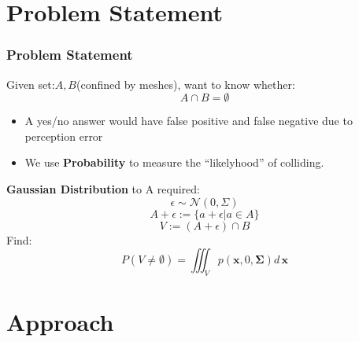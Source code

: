\documentclass{beamer}
\begin{document}

\section{Problem Statement} %


\begin{frame}
	\frametitle{Problem Statement}
	Given set:$A, B$(confined by meshes),
	want to know whether: 
	$$A \cap B = \emptyset$$
	\begin{itemize}
		\item A yes/no answer would have false positive and false negative due to perception error
		\item We use \textbf{Probability} to measure the ``likelyhood'' of colliding.
	\end{itemize}
	\textbf{Gaussian Distribution} to A required:
	$$\epsilon \sim \mathcal{N}(0, \Sigma)$$
	$$A + \epsilon := \{a+\epsilon | a \in A\}$$
	$$V := (A+\epsilon) \cap B$$
	Find: 
	$$P(V \neq \emptyset) = \iiint_Vp(\mathbf{x},0,\mathbf{\Sigma})d\,\mathbf{x}$$
\end{frame}

\section{Approach} %
\end{document}
